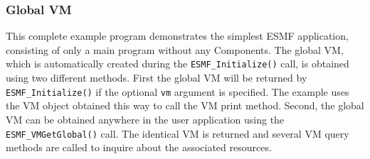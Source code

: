  
\setlength{\oldparskip}{\parskip}
\setlength{\parskip}{1.5ex}
\setlength{\oldparindent}{\parindent}
\setlength{\parindent}{0pt}
\setlength{\oldbaselineskip}{\baselineskip}
\setlength{\baselineskip}{11pt}
 
\def\bv{\begin{verbatim}}
\def\ev{\end{verbatim}}
\def\be{\begin{equation}}
\def\ee{\end{equation}}
\def\bea{\begin{eqnarray}}
\def\eea{\end{eqnarray}}
\def\bi{\begin{itemize}}
\def\ei{\end{itemize}}
\def\bn{\begin{enumerate}}
\def\en{\end{enumerate}}
\def\bd{\begin{description}}
\def\ed{\end{description}}
\def\({\left (}
\def\){\right )}
\def\[{\left [}
\def\]{\right ]}
\def\<{\left  \langle}
\def\>{\right \rangle}
\def\cI{{\cal I}}
\def\diag{\mathop{\rm diag}}
\def\tr{\mathop{\rm tr}}


 

  
   \subsubsection{Global VM}
  
   This complete example program demonstrates the simplest ESMF application, 
   consisting of only a main program without any Components. The global
   VM, which is automatically created during the {\tt ESMF\_Initialize()} call,
   is obtained using two different methods. First the global VM will be returned
   by {\tt ESMF\_Initialize()} if the optional {\tt vm} argument is specified.
   The example uses the VM object obtained this way to call the VM print method.
   Second, the global VM can be obtained anywhere in the user application using
   the {\tt ESMF\_VMGetGlobal()} call. The identical VM is returned and several
   VM query methods are called to inquire about the associated resources.
   
